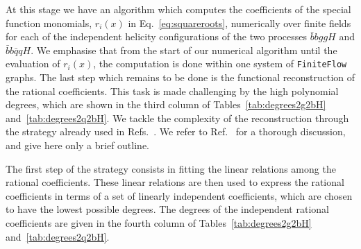 \documentclass[main.tex]{subfiles}
\begin{document}
At this stage we have an algorithm which computes the coefficients of the special function monomials, $r_i(x)$ in Eq.~\ref{eq:squareroots}, 
numerically over finite fields for each of the independent helicity configurations of the two processes $\bar{b}bggH$ and $\bar{b}b\bar{q}qH$. 
We emphasise that from the start of our numerical algorithm until the evaluation of $r_i(x)$, the computation is done within one system of \texttt{FiniteFlow} graphs.
The last step which remains to be done is the functional reconstruction of the rational coefficients. This task is made challenging by the high polynomial degrees, which are shown in the third column of Tables~\ref{tab:degrees2g2bH} and~\ref{tab:degrees2q2bH}. We tackle the complexity of the reconstruction through the strategy already used in Refs.~\cite{Badger:2021nhg,Badger:2021imn}. We refer to Ref.~\cite{Badger:2021imn} for a thorough discussion, and give here only a brief outline. 

The first step of the strategy consists in fitting the linear relations among the rational coefficients. These linear relations are then used to express the rational coefficients in terms of a set of linearly independent coefficients, which are chosen to have the lowest possible degrees. The degrees of the independent rational coefficients are given in the fourth column of Tables~\ref{tab:degrees2g2bH} and~\ref{tab:degrees2q2bH}.
\end{document}
